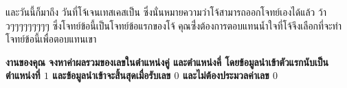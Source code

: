 \large{และวันนี้ก็มาถึง วันที่โจ้เจนเทสเคสเป็น ซึ่งนั่นหมายความว่าโจ้สามารถออกโจทย์เองได้แล้ว ว้าวๆๆๆๆๆๆๆๆๆ ซึ่งโจทย์ข้อนี้เป็นโจทย์ข้อแรกของโจ้ คุณซึ่่งต้องการตอบแทนน้ำใจที่โจ้จึงเลือกที่จะทำโจทย์ข้อนี้เพื่อตอบแทนเขา}

\large{\bf{งานของคุณ} จงหาค่าผลรวมของเลขในตำแหน่งคู่ และตำแหน่งคี่ \bf{โดยข้อมูลนำเข้าตัวแรกนับเป็นตำแหน่งที่ $1$} และข้อมูลนำเข้าจะสิ้นสุดเมื่อรับเลข $0$ และไม่ต้องประมวลค่าเลข $0$}